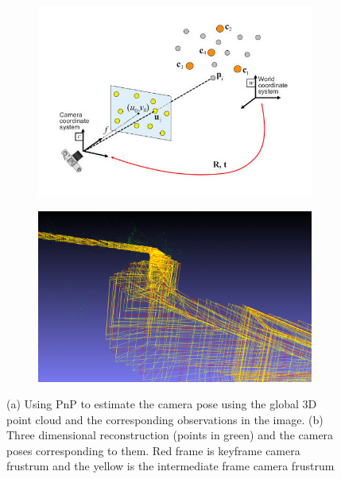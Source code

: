 \documentclass{article}
\begin{document}
\begin{figure}
    \centering
    \begin{subfigure}[b]{.45\linewidth}
        \includegraphics[width=\linewidth]{./pnp.jpg}
        \caption{}
        \label{fig:pnp}
    \end{subfigure}
    \begin{subfigure}[b]{.45\linewidth}
        \includegraphics[width=\linewidth]{./vo_stereo_7.png}
        \caption{}
        \label{fig:recon}
    \end{subfigure}
    \caption{(a) Using PnP to estimate the camera pose using the global 3D point cloud and the corresponding observations in the image. (b) Three dimensional reconstruction (points in green) and the camera poses corresponding to them. Red frame is keyframe camera frustrum and the yellow is the intermediate frame camera frustrum}
\end{figure}
\end{document}
